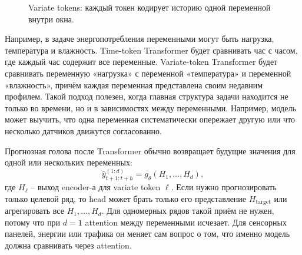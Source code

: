 \documentclass[12pt,fleqn]{article}
\begin{document}
\begin{figure}[!ht]
\centering
{}
\caption{Variate tokens: каждый токен кодирует историю одной переменной внутри окна.}
\end{figure}

Например, в задаче энергопотребления переменными могут быть нагрузка, температура и влажность.
Time-token Transformer будет сравнивать час с часом, где каждый час содержит все переменные.
Variate-token Transformer будет сравнивать переменную «нагрузка» с переменной «температура» и переменной «влажность», причём каждая переменная представлена своим недавним профилем.
Такой подход полезен, когда главная структура задачи находится не только во времени, но и в зависимостях между переменными.
Например, модель может выучить, что одна переменная систематически опережает другую или что несколько датчиков движутся согласованно.

Прогнозная голова после Transformer обычно возвращает будущие значения для одной или нескольких переменных:
\begin{equation}
  \widehat{y}_{t+1:t+h}^{(1:d)}
  =
  g_\theta(H_1, \ldots, H_d),
\end{equation}
где $H_\ell$ -- выход encoder-а для variate token $\ell$.
Если нужно прогнозировать только целевой ряд, то head может брать только его представление $H_{\mathrm{target}}$ или агрегировать все $H_1,\ldots,H_d$.
Для одномерных рядов такой приём не нужен, потому что при $d=1$ attention между переменными исчезает.
Для сенсорных панелей, энергии или трафика он меняет сам вопрос о том, что именно модель должна сравнивать через attention.
\end{document}
